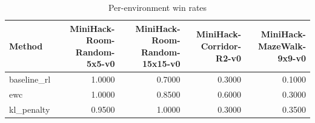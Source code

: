 \begin{table}[htbp]
\centering
\caption{Per-environment win rates}
\label{tab:per-env}
\begin{tabular}{lrrrr}
\toprule
\textbf{Method} & \textbf{MiniHack-Room-Random-5x5-v0} & \textbf{MiniHack-Room-Random-15x15-v0} & \textbf{MiniHack-Corridor-R2-v0} & \textbf{MiniHack-MazeWalk-9x9-v0} \\
\midrule
baseline\_rl & 1.0000 & 0.7000 & 0.3000 & 0.1000 \\
ewc & 1.0000 & 0.8500 & 0.6000 & 0.3000 \\
kl\_penalty & 0.9500 & 1.0000 & 0.3000 & 0.3500 \\
\bottomrule
\end{tabular}
\end{table}